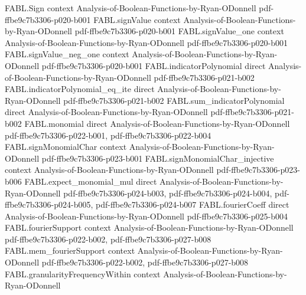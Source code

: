 \begin{theorem}
\label{FABL.biasedDiscreteDerivative_eq_fourier_sum}
\leanok
{}
\proofstep
  {FABL.Sign}
  {context}
  {Analysis-of-Boolean-Functions-by-Ryan-ODonnell}
  {pdf-ffbe9c7b3306-p020-b001}
\proofstep
  {FABL.signValue}
  {context}
  {Analysis-of-Boolean-Functions-by-Ryan-ODonnell}
  {pdf-ffbe9c7b3306-p020-b001}
\proofstep
  {FABL.signValue_one}
  {context}
  {Analysis-of-Boolean-Functions-by-Ryan-ODonnell}
  {pdf-ffbe9c7b3306-p020-b001}
\proofstep
  {FABL.signValue_neg_one}
  {context}
  {Analysis-of-Boolean-Functions-by-Ryan-ODonnell}
  {pdf-ffbe9c7b3306-p020-b001}
\proofstep
  {FABL.indicatorPolynomial}
  {direct}
  {Analysis-of-Boolean-Functions-by-Ryan-ODonnell}
  {pdf-ffbe9c7b3306-p021-b002}
\proofstep
  {FABL.indicatorPolynomial_eq_ite}
  {direct}
  {Analysis-of-Boolean-Functions-by-Ryan-ODonnell}
  {pdf-ffbe9c7b3306-p021-b002}
\proofstep
  {FABL.sum_indicatorPolynomial}
  {direct}
  {Analysis-of-Boolean-Functions-by-Ryan-ODonnell}
  {pdf-ffbe9c7b3306-p021-b002}
\proofstep
  {FABL.monomial}
  {direct}
  {Analysis-of-Boolean-Functions-by-Ryan-ODonnell}
  {pdf-ffbe9c7b3306-p022-b001,
    pdf-ffbe9c7b3306-p022-b004}
\proofstep
  {FABL.signMonomialChar}
  {context}
  {Analysis-of-Boolean-Functions-by-Ryan-ODonnell}
  {pdf-ffbe9c7b3306-p023-b001}
\proofstep
  {FABL.signMonomialChar_injective}
  {context}
  {Analysis-of-Boolean-Functions-by-Ryan-ODonnell}
  {pdf-ffbe9c7b3306-p023-b006}
\proofstep
  {FABL.expect_monomial_mul}
  {direct}
  {Analysis-of-Boolean-Functions-by-Ryan-ODonnell}
  {pdf-ffbe9c7b3306-p024-b003,
    pdf-ffbe9c7b3306-p024-b004,
    pdf-ffbe9c7b3306-p024-b005,
    pdf-ffbe9c7b3306-p024-b007}
\proofstep
  {FABL.fourierCoeff}
  {direct}
  {Analysis-of-Boolean-Functions-by-Ryan-ODonnell}
  {pdf-ffbe9c7b3306-p025-b004}
\proofstep
  {FABL.fourierSupport}
  {context}
  {Analysis-of-Boolean-Functions-by-Ryan-ODonnell}
  {pdf-ffbe9c7b3306-p022-b002,
    pdf-ffbe9c7b3306-p027-b008}
\proofstep
  {FABL.mem_fourierSupport}
  {context}
  {Analysis-of-Boolean-Functions-by-Ryan-ODonnell}
  {pdf-ffbe9c7b3306-p022-b002,
    pdf-ffbe9c7b3306-p027-b008}
\proofstep
  {FABL.granularityFrequencyWithin}
  {context}
  {Analysis-of-Boolean-Functions-by-Ryan-ODonnell}

\end{theorem}
